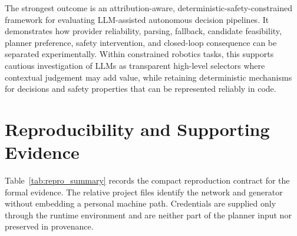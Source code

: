 \documentclass[letterpaper,10pt,conference]{ieeeconf}
\begin{document}
The strongest outcome is an attribution-aware, deterministic-safety-constrained framework for evaluating LLM-assisted autonomous decision pipelines. It demonstrates how provider reliability, parsing, fallback, candidate feasibility, planner preference, safety intervention, and closed-loop consequence can be separated experimentally. Within constrained robotics tasks, this supports cautious investigation of LLMs as transparent high-level selectors where contextual judgement may add value, while retaining deterministic mechanisms for decisions and safety properties that can be represented reliably in code.



\appendix

\section{Reproducibility and Supporting Evidence}

Table~\ref{tab:repro_summary} records the compact reproduction contract for the formal evidence. The relative project files identify the network and generator without embedding a personal machine path. Credentials are supplied only through the runtime environment and are neither part of the planner input nor preserved in provenance.
\end{document}
